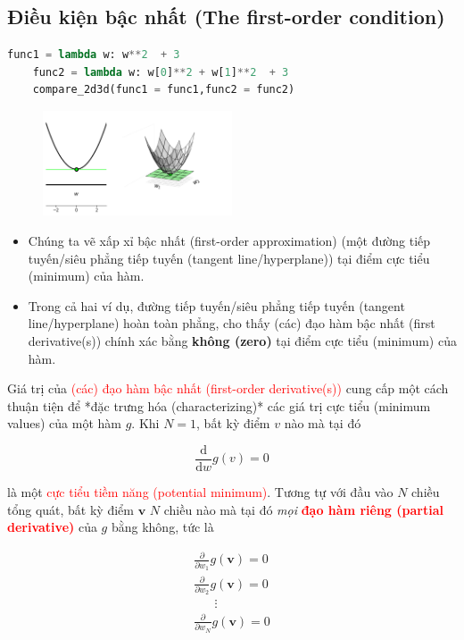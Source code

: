 \documentclass{book}
\begin{document}
\subsection{Điều kiện bậc nhất (The first-order condition)}
\begin{lstlisting}[language=Python, caption={Snippet of Python code to demonstrate the minimum values of two functions}, label={code:demonstrate_minimum_values}]
    func1 = lambda w: w**2  + 3
    func2 = lambda w: w[0]**2 + w[1]**2  + 3
    compare_2d3d(func1 = func1,func2 = func2)
\end{lstlisting}
\begin{figure}[H]
    \centering
    \includegraphics[width=0.5\textwidth]{images/first_order_condition.png}
\end{figure}
\begin{itemize}
    \item Chúng ta vẽ xấp xỉ bậc nhất (first-order approximation) (một đường tiếp tuyến/siêu phẳng tiếp tuyến (tangent line/hyperplane)) tại điểm cực tiểu (minimum) của hàm.
    \item Trong cả hai ví dụ, đường tiếp tuyến/siêu phẳng tiếp tuyến (tangent line/hyperplane) hoàn toàn phẳng, cho thấy (các) đạo hàm bậc nhất (first derivative(s)) chính xác bằng \textbf{không (zero)} tại điểm cực tiểu (minimum) của hàm.
\end{itemize}
Giá trị của \textcolor{red}{(các) đạo hàm bậc nhất (first-order derivative(s))} cung cấp một cách thuận tiện để *đặc trưng hóa (characterizing)* các giá trị cực tiểu (minimum values) của một hàm $g$. Khi $N=1$, bất kỳ điểm $v$ nào mà tại đó

\begin{equation}
    \frac{\mathrm{d}}{\mathrm{d}w}g\left(v\right)=0
\end{equation}

là một \textcolor{red}{cực tiểu tiềm năng (potential minimum)}.
Tương tự với đầu vào $N$ chiều tổng quát, bất kỳ điểm $\mathbf{v}$ $N$ chiều nào mà tại đó \textit{mọi} \textbf{\textcolor{red}{đạo hàm riêng (partial derivative)}} của $g$ bằng không, tức là

\begin{equation}
    \begin{array}{c}
        \frac{\partial}{\partial w_{1}}g(\mathbf{v})=0\\
        \frac{\partial}{\partial w_{2}}g(\mathbf{v})=0\\
        \,\,\,\,\,\,\,\,\,\,\vdots \\
        \frac{\partial}{\partial w_{N}}g(\mathbf{v})=0
    \end{array}
\end{equation}
\end{document}
